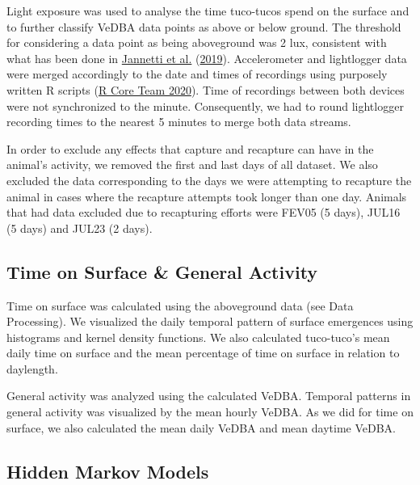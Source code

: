 \documentclass[english,msc,numbers,hidelinks]{coppe}
\begin{document}
  Light exposure was used to analyse the time tuco-tucos spend on the surface and to further classify VeDBA data points as above or below ground. The threshold for considering a data point as being aboveground was 2 lux, consistent with what has been done in \protect\hyperlink{ref-jannetti2019}{Jannetti et al.} (\protect\hyperlink{ref-jannetti2019}{2019}). Accelerometer and lightlogger data were merged accordingly to the date and times of recordings using purposely written R scripts (\protect\hyperlink{ref-rcoreteam2020}{R Core Team 2020}). Time of recordings between both devices were not synchronized to the minute. Consequently, we had to round lightlogger recording times to the nearest 5 minutes to merge both data streams.

  In order to exclude any effects that capture and recapture can have in the animal's activity, we removed the first and last days of all dataset. We also excluded the data corresponding to the days we were attempting to recapture the animal in cases where the recapture attempts took longer than one day. Animals that had data excluded due to recapturing efforts were FEV05 (5 days), JUL16 (5 days) and JUL23 (2 days).

  \hypertarget{time-on-surface-general-activity}{%
  \subsection{Time on Surface \& General Activity}\label{time-on-surface-general-activity}}

  Time on surface was calculated using the aboveground data (see Data Processing). We visualized the daily temporal pattern of surface emergences using histograms and kernel density functions. We also calculated tuco-tuco's mean daily time on surface and the mean percentage of time on surface in relation to daylength.

  General activity was analyzed using the calculated VeDBA. Temporal patterns in general activity was visualized by the mean hourly VeDBA. As we did for time on surface, we also calculated the mean daily VeDBA and mean daytime VeDBA.

  \hypertarget{hidden-markov-models}{%
  \subsection{Hidden Markov Models}\label{hidden-markov-models}}
\end{document}
